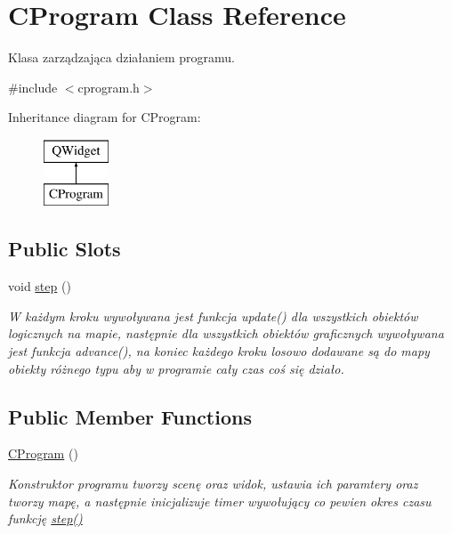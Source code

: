 \hypertarget{class_c_program}{}\section{C\+Program Class Reference}
\label{class_c_program}


Klasa zarządzająca działaniem programu.  




{\ttfamily \#include $<$cprogram.\+h$>$}

Inheritance diagram for C\+Program\+:\begin{figure}[H]
\begin{center}
\leavevmode
\includegraphics[height=2.000000cm]{class_c_program}
\end{center}
\end{figure}
\subsection*{Public Slots}
\begin{DoxyCompactItemize}
\item 
void \mbox{\hyperlink{class_c_program_a643bd73f256632b72a7d6182e8e7d807}{step}} ()
\begin{DoxyCompactList}\small\item\em W każdym kroku wywoływana jest funkcja update() dla wszystkich obiektów logicznych na mapie, następnie dla wszystkich obiektów graficznych wywoływana jest funkcja advance(), na koniec każdego kroku losowo dodawane są do mapy obiekty różnego typu aby w programie cały czas coś się działo. \end{DoxyCompactList}\end{DoxyCompactItemize}
\subsection*{Public Member Functions}
\begin{DoxyCompactItemize}
\item 
\mbox{\hyperlink{class_c_program_a74d3ca01d5e8b892f37684254ae546ed}{C\+Program}} ()
\begin{DoxyCompactList}\small\item\em Konstruktor programu tworzy scenę oraz widok, ustawia ich paramtery oraz tworzy mapę, a następnie inicjalizuje timer wywołujący co pewien okres czasu funkcję \mbox{\hyperlink{class_c_program_a643bd73f256632b72a7d6182e8e7d807}{step()}} \end{DoxyCompactList}\end{DoxyCompactItemize}


